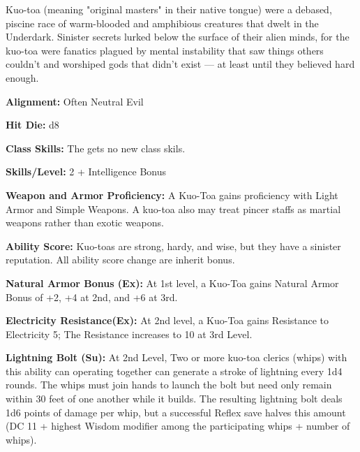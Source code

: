 
Kuo-toa (meaning "original masters" in their native tongue) were a debased, piscine race of warm-blooded and amphibious creatures that dwelt in the Underdark. Sinister secrets lurked below the surface of their alien minds, for the kuo-toa were fanatics plagued by mental instability that saw things others couldn't and worshiped gods that didn't exist — at least until they believed hard enough.

\textbf{Alignment:} Often Neutral Evil

\textbf{Hit Die:} d8

\textbf{Class Skills:} The \currentclassname{} gets no new class skils.

\textbf{Skills/Level:} 2 + Intelligence Bonus

\modebab{}
\poorfor{}
\poorref{}
\goodwil{}

\begin{classtable}
\end{classtable}

\classfeatures

\textbf{Weapon and Armor Proficiency:} A Kuo-Toa gains proficiency with Light Armor and Simple Weapons. A kuo-toa also may treat pincer staffs as martial weapons rather than exotic weapons.

\textbf{Ability Score:} Kuo-toas are strong, hardy, and wise, but they have a sinister reputation. All ability score change are inherit bonus.
 
 \textbf{Natural Armor Bonus (Ex):} At 1st level, a Kuo-Toa gains Natural Armor Bonus of +2, +4 at 2nd, and +6 at 3rd.
 
\textbf{Electricity Resistance(Ex):} At 2nd level, a Kuo-Toa gains Resistance to Electricity 5; The Resistance increases to 10 at 3rd Level.
 
\textbf{Lightning Bolt (Su):} At 2nd Level, Two or more kuo-toa clerics (whips) with this ability can operating together can generate a stroke of lightning every 1d4 rounds. The whips must join hands to launch the bolt but need only remain within 30 feet of one another while it builds. The resulting lightning bolt deals 1d6 points of damage per whip, but a successful Reflex save halves this amount (DC 11 + highest Wisdom modifier among the participating whips + number of whips).